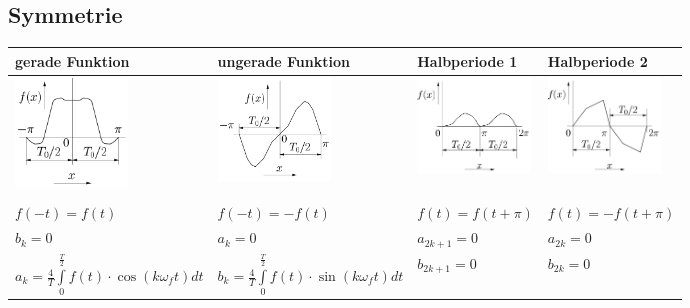 	\subsection{Symmetrie}
		\begin{tabular}{|p{4.3cm}|p{4.3cm}|p{4.4cm}|p{4.4cm}|}
         	\hline
        	\textbf{gerade Funktion} & \textbf{ungerade Funktion} &
        	\textbf{Halbperiode 1} & \textbf{Halbperiode 2}\\
        	\hline
        	\includegraphics[width=3cm]{Content/03_transforms/gerade_funktion.png}&
        	\includegraphics[width=3cm]{Content/03_transforms/ungerade_funktion.png}&   
 			\includegraphics[width=3cm]{Content/03_transforms/halbperiode_1.png}&   
			\includegraphics[width=3cm]{Content/03_transforms/halbperiode_2.png}\\
			\hline & & & \\			
   			$f(-t)=f(t)$ & $f(-t)=-f(t)$ & $f(t)=f(t+\pi)$ & $f(t)=-f(t+\pi)$\\
   			$b_k=0$ & $a_k=0$ & $a_{2k+1}=0$ & $a_{2k}=0$\\
   			$a_k = \frac{4}{T} \int\limits_0^{\frac{T}{2}} f(t) \cdot \cos(k \omega_f
   			t) dt$ &
   			$b_k =  \frac{4}{T} \int\limits_0^{\frac{T}{2}} f(t) \cdot
			\sin(k \omega_f t) dt$ &
			$b_{2k+1}=0$ & $b_{2k}=0$\\
			\hline
      	\end{tabular} 
     	
